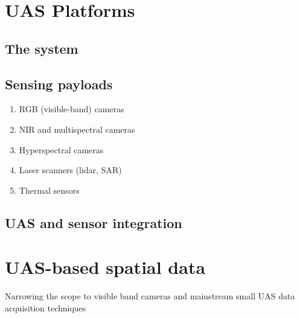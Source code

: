 \documentclass[final,3p,times,twocolumn]{elsarticle}
\begin{document}
\section{UAS Platforms} \label{UASplatforms}

\subsection{The system }


\subsection{Sensing payloads}
\begin{enumerate}
\item RGB (visible-band) cameras
\item NIR and multispectral cameras
\item Hyperspectral cameras
\item Laser scanners (lidar, SAR)
\item Thermal sensors
\end{enumerate}

\subsection{UAS and sensor integration}

\section{UAS-based spatial data}
Narrowing the scope to visible band cameras and mainstream small UAS data acquisition techniques
\end{document}
